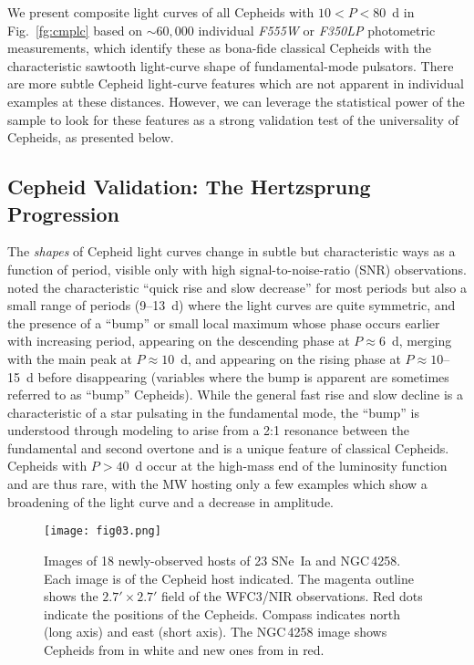 \documentclass[12pt]{aastex631}
\begin{document}
We present composite light curves of all Cepheids with $10 < P < 80$~d in Fig.~\ref{fg:cmplc} based on $\sim 60,000$ individual {\it F555W} or {\it F350LP} photometric measurements, which identify these as bona-fide classical Cepheids with the characteristic sawtooth light-curve shape of fundamental-mode pulsators. There are more subtle Cepheid light-curve features which are not apparent in individual examples at these distances.  However, we can leverage the statistical power of the sample to look for these features as a strong validation test of the universality of Cepheids, as presented below.

\subsection{Cepheid Validation: The Hertzsprung Progression\label{sc:3.2}}
   
The {\it shapes} of Cepheid light curves change in subtle but characteristic ways \citep[often referred to as the ``Hertzsprung Progression'';][]{Hertzsprung:1926} as a function of period, visible only with high signal-to-noise-ratio (SNR) observations. \citet{Hertzsprung:1926}  noted the characteristic ``quick rise and slow decrease'' for most periods but also a small range of periods (9--13~d) where the light curves are quite symmetric, and the presence of a ``bump'' or small local maximum whose phase occurs earlier with increasing period, appearing on the descending phase at $P \approx 6$~d, merging with the main peak at $P \approx 10$~d, and appearing on the rising phase at $P \approx 10$--15~d before disappearing (variables where the bump is apparent are sometimes referred to as ``bump'' Cepheids). While the general fast rise and slow decline is a characteristic of a star pulsating in the fundamental mode, the ``bump'' is understood through modeling to arise from a 2:1 resonance between the fundamental and second overtone \citep{Cox:1993,Bono:2002} and is a unique feature of classical Cepheids.  Cepheids with $P>40$~d occur at the high-mass end of the luminosity function and are thus rare, with the MW hosting only a few examples which show a broadening of the light curve and a decrease in amplitude.  

\begin{figure}[ht]
\texttt{[image: fig03.png]}
\caption{\label{fg:hstfovs} Images of 18 newly-observed hosts of 23 SNe~Ia and NGC$\,$4258. Each image is of the Cepheid host indicated.  The magenta outline shows the $2.7' \times 2.7'$ field of the WFC3/NIR observations.  Red dots indicate the positions of the Cepheids.  Compass indicates north (long axis) and east (short axis). The NGC$\,$4258 image shows Cepheids from \citet{macri06} in white and new ones from \citet{Yuan:2021_N4258} in red.} 
\end{figure}
\end{document}
